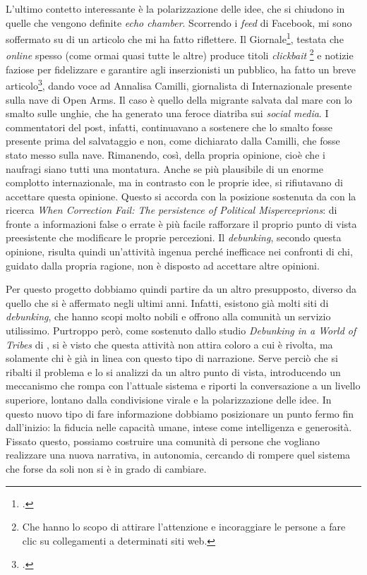 \documentclass{article}
\begin{document}
L’ultimo contetto interessante è la polarizzazione delle idee, che si chiudono in quelle che vengono definite \textit{echo chamber}. Scorrendo i \textit{feed} di Facebook, mi sono soffermato su di un articolo che mi ha fatto riflettere. Il Giornale\footcite{noauthor_ultime_nodate}, testata che \textit{online} spesso (come ormai quasi tutte le altre) produce titoli \textit{clickbait}%
\footnote{Che hanno lo scopo di attirare l’attenzione e incoraggiare le persone a fare clic su collegamenti a determinati siti web\parencite{noauthor_clickbait_nodate}.} e notizie faziose per fidelizzare e garantire agli inserzionisti un pubblico, ha fatto un breve articolo\footcite{cartaldo_ecco_nodate}, dando voce ad Annalisa Camilli, giornalista di Internazionale presente sulla nave di Open Arms. Il caso è quello della migrante salvata dal mare con lo smalto sulle unghie, che ha generato una feroce diatriba sui \textit{social media}. I commentatori del post, infatti, continuavano a sostenere che lo smalto fosse presente prima del salvataggio e non, come dichiarato dalla Camilli, che fosse stato messo sulla nave. Rimanendo, così, della propria opinione, cioè che i naufragi siano tutti una montatura. Anche se più plausibile di un enorme complotto internazionale, ma in contrasto con le proprie idee, si rifiutavano di accettare questa opinione. Questo si accorda con la posizione sostenuta da \textcite{nyhan_when_2010} con la ricerca \textit{When Correction Fail: The persistence of Political Misperceprions}: di fronte a informazioni false o errate è più facile rafforzare il proprio punto di vista preesistente che modificare le proprie percezioni. Il \textit{debunking}, secondo questa opinione, risulta quindi un’attività ingenua perché inefficace nei confronti di chi, guidato dalla propria ragione, non è disposto ad accettare altre opinioni.
 
 Per questo progetto dobbiamo quindi partire da un altro presupposto, diverso da quello che si è affermato negli ultimi anni. Infatti, esistono già molti siti di \textit{debunking}, che hanno scopi molto nobili e offrono alla comunità un servizio utilissimo. Purtroppo però, come sostenuto dallo studio \textit{Debunking in a World of Tribes} di \textcite{zollo_debunking_2017}, si è visto che questa attività non attira coloro a cui è rivolta, ma solamente chi è già in linea con questo tipo di narrazione. Serve perciò che si ribalti il problema e lo si analizzi da un altro punto di vista, introducendo un meccanismo che rompa con l’attuale sistema e riporti la conversazione a un livello superiore, lontano dalla condivisione virale e la polarizzazione delle idee. In questo nuovo tipo di fare informazione dobbiamo posizionare un punto fermo fin dall’inizio: la fiducia nelle capacità umane, intese come intelligenza e generosità. Fissato questo, possiamo costruire una comunità di persone che vogliano realizzare una nuova narrativa, in autonomia, cercando di rompere quel sistema che forse da soli non si è in grado di cambiare.
 
\end{document}
